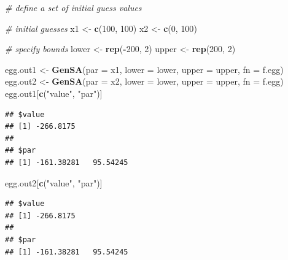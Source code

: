 \documentclass[
]{article}
\newenvironment{Shaded}{\begin{snugshade}}{\end{snugshade}}
\newcommand{\AttributeTok}[1]{\textcolor[rgb]{0.13,0.29,0.53}{#1}}
\newcommand{\CommentTok}[1]{\textcolor[rgb]{0.56,0.35,0.01}{\textit{#1}}}
\newcommand{\DecValTok}[1]{\textcolor[rgb]{0.00,0.00,0.81}{#1}}
\newcommand{\FunctionTok}[1]{\textcolor[rgb]{0.13,0.29,0.53}{\textbf{#1}}}
\newcommand{\NormalTok}[1]{#1}
\newcommand{\OtherTok}[1]{\textcolor[rgb]{0.56,0.35,0.01}{#1}}
\newcommand{\SpecialCharTok}[1]{\textcolor[rgb]{0.81,0.36,0.00}{\textbf{#1}}}
\newcommand{\StringTok}[1]{\textcolor[rgb]{0.31,0.60,0.02}{#1}}
\begin{document}
\begin{Shaded}
\begin{Highlighting}[]
\CommentTok{\# define a set of initial guess values}

\CommentTok{\# initial guesses}
\NormalTok{x1 }\OtherTok{\textless{}{-}} \FunctionTok{c}\NormalTok{(}\DecValTok{100}\NormalTok{, }\DecValTok{100}\NormalTok{)}
\NormalTok{x2 }\OtherTok{\textless{}{-}} \FunctionTok{c}\NormalTok{(}\DecValTok{0}\NormalTok{, }\DecValTok{100}\NormalTok{)}

\CommentTok{\# specify bounds}
\NormalTok{lower }\OtherTok{\textless{}{-}} \FunctionTok{rep}\NormalTok{(}\SpecialCharTok{{-}}\DecValTok{200}\NormalTok{, }\DecValTok{2}\NormalTok{)}
\NormalTok{upper }\OtherTok{\textless{}{-}} \FunctionTok{rep}\NormalTok{(}\DecValTok{200}\NormalTok{, }\DecValTok{2}\NormalTok{)}


\NormalTok{egg.out1 }\OtherTok{\textless{}{-}} \FunctionTok{GenSA}\NormalTok{(}\AttributeTok{par =}\NormalTok{ x1, }\AttributeTok{lower =}\NormalTok{ lower, }\AttributeTok{upper =}\NormalTok{ upper, }\AttributeTok{fn =}\NormalTok{ f.egg)}
\NormalTok{egg.out2 }\OtherTok{\textless{}{-}} \FunctionTok{GenSA}\NormalTok{(}\AttributeTok{par =}\NormalTok{ x2, }\AttributeTok{lower =}\NormalTok{ lower, }\AttributeTok{upper =}\NormalTok{ upper, }\AttributeTok{fn =}\NormalTok{ f.egg)}
\NormalTok{egg.out1[}\FunctionTok{c}\NormalTok{(}\StringTok{"value"}\NormalTok{, }\StringTok{"par"}\NormalTok{)]}
\end{Highlighting}
\end{Shaded}

\begin{verbatim}
## $value
## [1] -266.8175
## 
## $par
## [1] -161.38281   95.54245
\end{verbatim}

\begin{Shaded}
\begin{Highlighting}[]
\NormalTok{egg.out2[}\FunctionTok{c}\NormalTok{(}\StringTok{"value"}\NormalTok{, }\StringTok{"par"}\NormalTok{)]}
\end{Highlighting}
\end{Shaded}

\begin{verbatim}
## $value
## [1] -266.8175
## 
## $par
## [1] -161.38281   95.54245
\end{verbatim}
\end{document}
